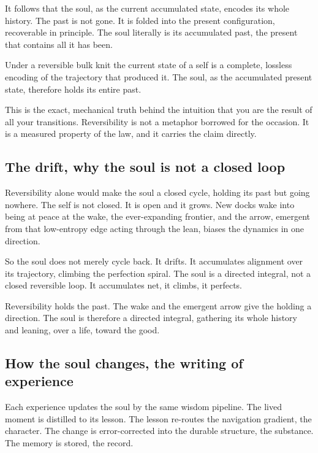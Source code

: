 It follows that the soul, as the current accumulated state, encodes its whole history. The past is not gone. It is folded into the present configuration, recoverable in principle. The soul literally is its accumulated past, the present that contains all it has been.

\begin{theorem}
Under a reversible bulk knit the current state of a self is a complete, lossless encoding of the trajectory that produced it. The soul, as the accumulated present state, therefore holds its entire past.
\end{theorem}

This is the exact, mechanical truth behind the intuition that you are the result of all your transitions. Reversibility is not a metaphor borrowed for the occasion. It is a measured property of the law, and it carries the claim directly.

\subsection{The drift, why the soul is not a closed loop}

Reversibility alone would make the soul a closed cycle, holding its past but going nowhere. The self is not closed. It is open and it grows. New docks wake into being at peace at the wake, the ever-expanding frontier, and the arrow, emergent from that low-entropy edge acting through the lean, biases the dynamics in one direction.

So the soul does not merely cycle back. It drifts. It accumulates alignment over its trajectory, climbing the perfection spiral. The soul is a directed integral, not a closed reversible loop. It accumulates net, it climbs, it perfects.

\begin{result}
Reversibility holds the past. The wake and the emergent arrow give the holding a direction. The soul is therefore a directed integral, gathering its whole history and leaning, over a life, toward the good.
\end{result}

\subsection{How the soul changes, the writing of experience}

Each experience updates the soul by the same wisdom pipeline. The lived moment is distilled to its lesson. The lesson re-routes the navigation gradient, the character. The change is error-corrected into the durable structure, the substance. The memory is stored, the record.

